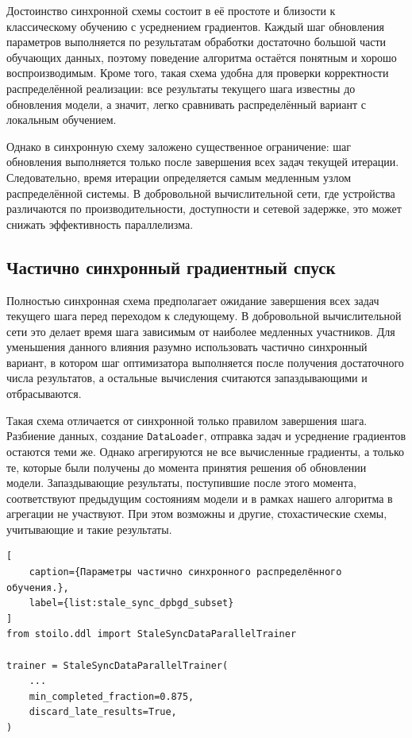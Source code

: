 \documentclass[a4paper,12pt]{extarticle}
\begin{document}
Достоинство синхронной схемы состоит в её простоте и близости к классическому обучению с усреднением градиентов.
Каждый шаг обновления параметров выполняется по результатам обработки достаточно большой части обучающих данных, поэтому поведение алгоритма остаётся понятным и хорошо воспроизводимым.
Кроме того, такая схема удобна для проверки корректности распределённой реализации: все результаты текущего шага известны до обновления модели, а значит, легко сравнивать распределённый вариант с локальным обучением.

Однако в синхронную схему заложено существенное ограничение: шаг обновления выполняется только после завершения всех задач текущей итерации.
Следовательно, время итерации определяется самым медленным узлом распределённой системы.
В добровольной вычислительной сети, где устройства различаются по производительности, доступности и сетевой задержке, это может снижать эффективность параллелизма.

\subsection{Частично синхронный градиентный спуск}

Полностью синхронная схема предполагает ожидание завершения всех задач текущего шага перед переходом к следующему.
В добровольной вычислительной сети это делает время шага зависимым от наиболее медленных участников.
Для уменьшения данного влияния разумно использовать частично синхронный вариант, в котором шаг оптимизатора выполняется после получения достаточного числа результатов, а остальные вычисления считаются запаздывающими и отбрасываются.

Такая схема отличается от синхронной только правилом завершения шага.
Разбиение данных, создание \texttt{DataLoader}, отправка задач и усреднение градиентов остаются теми же.
Однако агрегируются не все вычисленные градиенты, а только те, которые были получены до момента принятия решения об обновлении модели.
Запаздывающие результаты, поступившие после этого момента, соответствуют предыдущим состояниям модели и в рамках нашего алгоритма в агрегации не участвуют. При этом возможны и другие, стохастические схемы, учитывающие и такие результаты.

\begin{lstlisting}[
    caption={Параметры частично синхронного распределённого обучения.},
    label={list:stale_sync_dpbgd_subset}
]
from stoilo.ddl import StaleSyncDataParallelTrainer

trainer = StaleSyncDataParallelTrainer(
    ...
    min_completed_fraction=0.875,
    discard_late_results=True,
)
\end{lstlisting}
\end{document}
